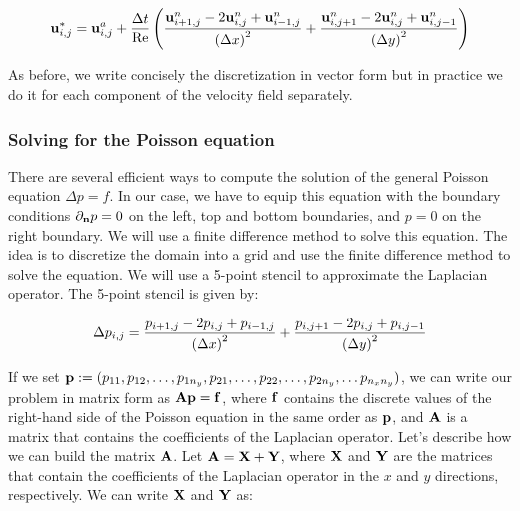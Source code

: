 \begin{equation*}
  \boldsymbol{\mathrm{u}}^*_{i,j} = \boldsymbol{\mathrm{u}}^a_{i,j} + \frac{\Delta t}{\mathrm{Re}}\left( \frac{\boldsymbol{\mathrm{u}}^n_{i+1,j} - 2\boldsymbol{\mathrm{u}}^n_{i,j} + \boldsymbol{\mathrm{u}}^n_{i-1,j}}{{(\Delta x)}^2} + \frac{\boldsymbol{\mathrm{u}}^n_{i,j+1} - 2\boldsymbol{\mathrm{u}}^n_{i,j} + \boldsymbol{\mathrm{u}}^n_{i,j-1}}{{(\Delta y)}^2}\right)
\end{equation*}

As before, we write concisely the discretization in vector form but in practice we do it for each component of the velocity field separately.

\subsubsection*{Solving for the Poisson equation}\label{sec: solvingPoisson}
There are several efficient ways to compute the solution of the general Poisson equation $\Delta p = f$. In our case, we have to equip this equation with the boundary conditions $\partial_{\boldsymbol{\mathrm{n}}}p=0$ on the left, top and bottom boundaries, and $p=0$ on the right boundary. We will use a finite difference method to solve this equation. The idea is to discretize the domain into a grid and use the finite difference method to solve the equation. We will use a 5-point stencil to approximate the Laplacian operator. The 5-point stencil is given by:

\begin{equation*}
  \Delta p_{i,j} = \frac{p_{i+1,j} - 2 p_{i,j} + p_{i-1,j}}{{(\Delta x)}^2} + \frac{p_{i,j+1} - 2 p_{i,j} + p_{i,j-1}}{{(\Delta y)}^2}
\end{equation*}

If we set $\boldsymbol{\mathrm{p}}:=(p_{11}, p_{12}, \ldots, p_{1n_y}, p_{21}, \ldots, p_{22}, \ldots, p_{2n_y},\ldots p_{n_xn_y})$, we can write our problem in matrix form as $\boldsymbol{\mathrm{A}}\boldsymbol{\mathrm{p}}=\boldsymbol{\mathrm{f}}$, where $\boldsymbol{\mathrm{f}}$ contains the discrete values of the right-hand side of the Poisson equation in the same order as $\boldsymbol{\mathrm{p}}$, and $\boldsymbol{\mathrm{A}}$ is a matrix that contains the coefficients of the Laplacian operator. Let's describe how we can build the matrix $\boldsymbol{\mathrm{A}}$. Let $\boldsymbol{\mathrm{A}}=\boldsymbol{\mathrm{X}} + \boldsymbol{\mathrm{Y}}$, where $\boldsymbol{\mathrm{X}}$ and $\boldsymbol{\mathrm{Y}}$ are the matrices that contain the coefficients of the Laplacian operator in the $x$ and $y$ directions, respectively. We can write $\boldsymbol{\mathrm{X}}$ and $\boldsymbol{\mathrm{Y}}$ as:

